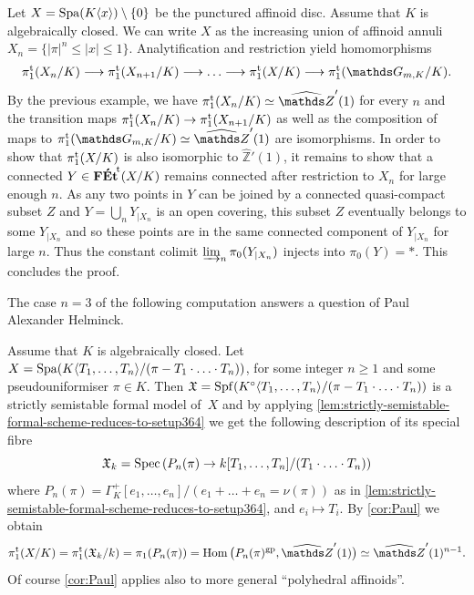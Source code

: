 \begin{ex}
   Let $X = \operatorname{Spa}(K\langle x\rangle)\setminus\{0\}$ be the punctured affinoid disc.  Assume that $K$ is algebraically closed. 
   We can write $X$ as the increasing union of affinoid annuli $X_n = \{|\pi|^n\leq |x|\leq 1\}$. 
   Analytification and restriction yield homomorphisms
   \[
   \pitame(X_n/K) \la \pitame(X_{n+1}/K) \la \ldots \la \pitame(X/K) \la \pitame(\mathbb{G}_{m,K}/K).
   \]
   By the previous example, we have $\pitame(X_n/K) \simeq \widehat{\mathbb{Z}}'(1)$ for every $n$ and the transition maps $\pi_1^{\mathrm{t}}(X_n/K)\to \pi_1^{\mathrm{t}}(X_{n+1}/K)$ as well as the composition of maps to $\pitame(\mathbb{G}_{m,K}/K) \simeq \widehat{\mathbb{Z}}'(1)$ are isomorphisms. In order to show that $\pi_1^{\mathrm{t}}(X/K)$ is also isomorphic to $\widehat{\mathbb{Z}}'(1)$, it remains to show that a connected $Y \in {\mathbf{F\acute{E}t}}^{\!\mathrm{t}}(X/K)$ remains connected after restriction to $X_n$ for large enough $n$. As any two points in $Y$ can be joined by a connected quasi-compact subset $Z$ and $Y = \bigcup_n Y_{|X_n}$  is an open covering, this subset $Z$ eventually belongs to some $Y_{|X_n}$ and so these points are in the same connected component of $Y_{|X_n}$ for large $n$. Thus the constant colimit $\varinjlim_n \pi_0(Y_{|X_n})$ injects into $\pi_0(Y) = *$. This concludes the proof. 
\end{ex}

The case $n=3$ of the following computation answers a question of Paul Alexander Helminck.

\begin{ex} \label{ex:helminck}
    Assume that $K$ is algebraically closed. 
    Let $X = \operatorname{Spa}(K\langle T_1,\ldots,T_n\rangle/(\pi - T_1 \cdot \ldots \cdot T_n))$, for some integer $n \geq 1$ and some pseudouniformiser $\pi \in K$. 
    Then ${\mathfrak{X}} = \operatorname{Spf}(K^\circ\langle T_1, \ldots, T_n\rangle/(\pi - T_1 \cdot \ldots \cdot T_n))$ is a strictly semistable formal model of~$X$ and by applying 
    \cref{lem:strictly-semistable-formal-scheme-reduces-to-setup364}
    we get the following description of its special fibre 
    \[
        {\mathfrak{X}}_k = \operatorname{Spec}\left(P_{n}(\pi) \to k[T_1, \ldots,T_n]/(T_1 \cdot \ldots \cdot T_n)\right)
    \]   
    where $P_{n}(\pi) = \Gamma_K^+[e_1, \ldots, e_n]/(e_1 + \ldots + e_n = \nu(\pi))$ as in \cref{lem:strictly-semistable-formal-scheme-reduces-to-setup364}, and $e_i \mapsto T_i$.
    By \cref{cor:Paul} we obtain
    \[
        \pitame(X/K)  = \pitame(\fX_k/k) = \pi_1(P_{n}(\pi))
        = \Hom\big(P_{n}(\pi)^\gp, \widehat{\bZ}'(1)\big) 
        \simeq \widehat{\bZ}'(1)^{n-1}.
    \]    
    Of course \cref{cor:Paul} applies also to more general ``polyhedral affinoids''.
\end{ex}





